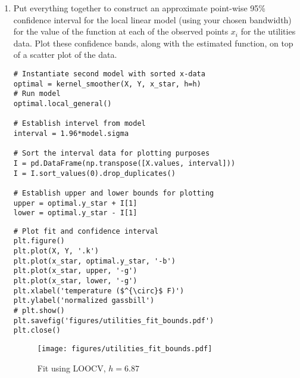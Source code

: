 \documentclass[10pt]{article}
\begin{document}
\begin{enumerate}[label=(\Alph*)]
\begin{lstlisting}
# Plot residuals
plt.figure()
plt.plot(X, model.residuals, '.k')
plt.xlabel('temperature ($^{\circ}$ F)')
plt.ylabel('log(residuals)')
# plt.show()
plt.savefig('figures/utilities_residuals_log.pdf')
plt.close()
        \end{lstlisting}

        It appears that in the log space, the residuals appear to be relatively homoscedastic. 

        \begin{figure}
            \begin{subfigure}{.5\textwidth}
              \centering
              \texttt{[image: figures/utilities\_residuals]}
            \end{subfigure}%
            \begin{subfigure}{.5\textwidth}
              \centering
              \texttt{[image: figures/utilities\_residuals\_log]}
            \end{subfigure}
        \caption{Residuals and log-residuals}
        \label{fig:standard_error}
        \end{figure}

        \item Put everything together to construct an approximate point-wise 95\% confidence interval for the local linear model (using your chosen bandwidth) for the value of the function at each of the observed points $x_i$ for the utilities data. Plot these confidence bands, along with the estimated function, on top of a scatter plot of the data.

        \begin{lstlisting}
# Instantiate second model with sorted x-data
optimal = kernel_smoother(X, Y, x_star, h=h)
# Run model
optimal.local_general()

# Establish intervel from model
interval = 1.96*model.sigma

# Sort the interval data for plotting purposes
I = pd.DataFrame(np.transpose([X.values, interval]))
I = I.sort_values(0).drop_duplicates()

# Establish upper and lower bounds for plotting
upper = optimal.y_star + I[1]
lower = optimal.y_star - I[1]
        \end{lstlisting}

        \begin{lstlisting}
# Plot fit and confidence interval
plt.figure()
plt.plot(X, Y, '.k')
plt.plot(x_star, optimal.y_star, '-b')
plt.plot(x_star, upper, '-g')
plt.plot(x_star, lower, '-g')
plt.xlabel('temperature ($^{\circ}$ F)')
plt.ylabel('normalized gassbill')
# plt.show()
plt.savefig('figures/utilities_fit_bounds.pdf')
plt.close()
        \end{lstlisting}

        \begin{figure}[ht] 
          \centering 
          \texttt{[image: figures/utilities\_fit\_bounds.pdf]}
          \caption{\label{fig:utilities_fit_bounds} Fit using LOOCV, $h=6.87$}
        \end{figure}

    \end{enumerate}
\end{document}
